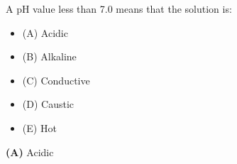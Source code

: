 

A pH value less than 7.0 means that the solution is:

\begin{itemize}
\item{(A)} Acidic
\vskip 5pt 
\item{(B)} Alkaline
\vskip 5pt 
\item{(C)} Conductive
\vskip 5pt 
\item{(D)} Caustic
\vskip 5pt 
\item{(E)} Hot
\end{itemize}







{\bf (A)} Acidic
 









